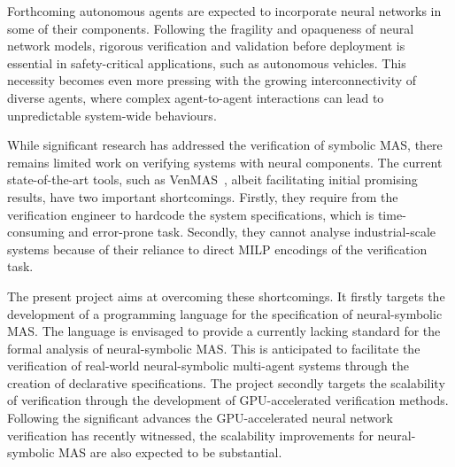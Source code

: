 \documentclass[11pt]{article}
\begin{document}

Forthcoming autonomous  agents are expected to incorporate
neural networks in some of their components. Following the
fragility and opaqueness of neural network models, rigorous
verification and validation before deployment is essential
in safety-critical applications, such as autonomous
vehicles. This necessity becomes even more pressing with the
growing interconnectivity of diverse agents, where complex
agent-to-agent interactions can lead to unpredictable
system-wide behaviours.

While significant research has addressed the verification of
symbolic MAS, there remains limited work on
verifying systems with neural components. The current
state-of-the-art tools,  such as {\sc
VenMAS}~\cite{Akintunde+20}, albeit facilitating initial
promising results, have two important shortcomings. Firstly,
they require from the verification engineer to  hardcode the
system specifications, which is time-consuming and
error-prone task. Secondly, they cannot analyse
industrial-scale systems because of their reliance to direct
MILP encodings of the verification task. 

The present project aims at overcoming these shortcomings.
It firstly targets the development of a programming language
for the specification of neural-symbolic MAS. The language
is envisaged to provide a currently lacking standard for the
formal analysis of neural-symbolic MAS. This is anticipated
to facilitate the verification of real-world neural-symbolic
multi-agent systems through the creation of declarative
specifications. The project secondly targets the scalability
of verification through the development of GPU-accelerated
verification methods. Following the significant advances the
GPU-accelerated neural network verification has recently
witnessed, the scalability improvements for neural-symbolic
MAS are also expected to be substantial.


  
\end{document}
